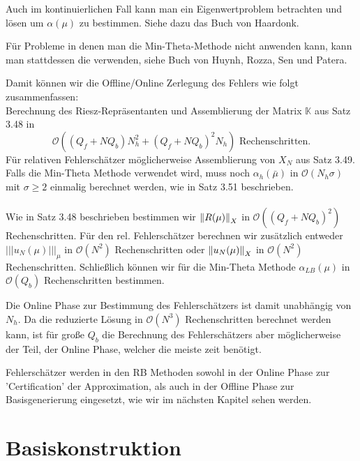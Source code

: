 Auch im kontinuierlichen Fall kann man ein Eigenwertproblem betrachten und lösen um $\alpha(\mu)$ zu bestimmen.
Siehe dazu das Buch von Haardonk.

Für Probleme in denen man die Min-Theta-Methode nicht anwenden kann, kann man stattdessen die  verwenden, siehe Buch von Huynh, Rozza, Sen und Patera.

Damit können wir die Offline/Online Zerlegung des Fehlers wie folgt zusammenfassen:
\\
Berechnung des Riesz-Repräsentanten und Assemblierung der Matrix $\mathbb{K}$ aus Satz 3.48 in 
\[
\mathcal{O}((Q_f+NQ_b)N_h^2+(Q_f+NQ_b)^2N_h) \text{ Rechenschritten.}
\]
Für relativen Fehlerschätzer möglicherweise Assemblierung von $X_N$ aus Satz 3.49.
Falls die Min-Theta Methode verwendet wird, muss noch $\alpha_h(\bar{\mu})$ in $\mathcal{O}(N_h\sigma)$ mit $\sigma\ge 2$ einmalig berechnet werden, wie in Satz 3.51 beschrieben.\\

\\
Wie in Satz 3.48 beschrieben bestimmen wir $\left\Vert R(\mu)\right\Vert_X$ in $\mathcal{O}((Q_f+NQ_b)^2)$ Rechenschritten.
Für den rel. Fehlerschätzer berechnen wir zusätzlich entweder $|||u_N(\mu)|||_\mu$ in $\mathcal{O}(N^2)$ Rechenschritten oder $\left\Vert u_N(\mu)\right\Vert_X$ in $\mathcal{O}(N^2)$ Rechenschritten.
Schließlich können wir für die Min-Theta Methode $\alpha_{LB}(\mu)$ in $\mathcal{O}(Q_b)$ Rechenschritten bestimmen.

Die Online Phase zur Bestimmung des Fehlerschätzers ist damit unabhängig von $N_h$.
Da die reduzierte Lösung in $\mathcal{O}(N^3)$ Rechenschritten berechnet werden kann, ist für große $Q_b$ die Berechnung des Fehlerschätzers aber möglicherweise der Teil, der Online Phase, welcher die meiste zeit benötigt.

Fehlerschätzer werden in den RB Methoden sowohl in der Online Phase zur 'Certification' der Approximation, als auch in der Offline Phase zur Basisgenerierung eingesetzt, wie wir im nächsten Kapitel sehen werden.
\newpage

\section{Basiskonstruktion}

